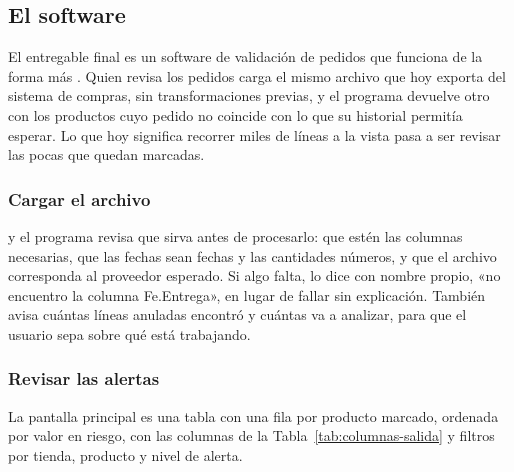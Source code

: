 \subsection{El software}
\label{sec:software}

El entregable final es un software de validación de pedidos que funciona de la forma más \textbf{}. Quien revisa los pedidos carga el mismo archivo que hoy exporta del sistema de compras, sin transformaciones previas, y el programa devuelve otro con los productos cuyo pedido no coincide con lo que su historial permitía esperar. Lo que hoy significa recorrer miles de líneas a la vista pasa a ser revisar las pocas que quedan marcadas.


\iffinal\else
\subsubsection{Cargar el archivo}

 y el programa revisa que sirva antes de procesarlo: que estén las columnas necesarias, que las fechas sean fechas y las cantidades números, y que el archivo corresponda al proveedor esperado. Si algo falta, lo dice con nombre propio, «no encuentro la columna Fe.Entrega», en lugar de fallar sin explicación. También avisa cuántas líneas anuladas encontró y cuántas va a analizar, para que el usuario sepa sobre qué está trabajando.


\fi
\subsubsection{Revisar las alertas}

La pantalla principal es una tabla con una fila por producto marcado, ordenada por valor en riesgo, con las columnas de la Tabla~\ref{tab:columnas-salida} y filtros por tienda, producto y nivel de alerta.

